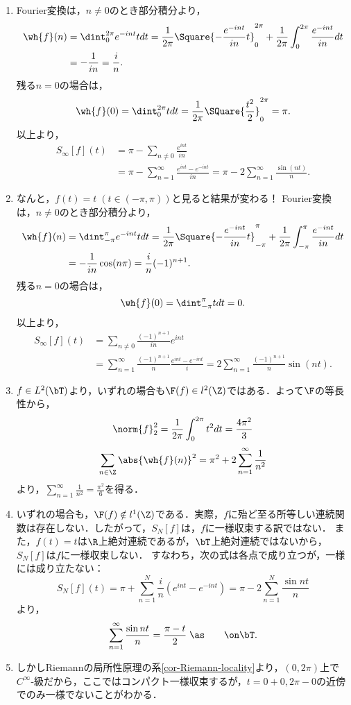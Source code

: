 \documentclass[uplatex,dvipdfmx]{jsreport}
\begin{document}
\begin{Proof}\mbox{}
    \begin{enumerate}
        \item Fourier変換は，$n\ne0$のとき部分積分より，
        \begin{align*}
            \wh{f}(n)&=\dint^{2\pi}_{0}e^{-int}tdt=\frac{1}{2\pi}\Square{-\frac{e^{-int}}{in}t}^{2\pi}_{0}+\frac{1}{2\pi}\int^{2\pi}_{0}\frac{e^{-int}}{in}dt\\
            &=-\frac{1}{in}=\frac{i}{n}.
        \end{align*}
        残る$n=0$の場合は，
        \[\wh{f}(0)=\dint^{2\pi}_0tdt=\frac{1}{2\pi}\SQuare{\frac{t^2}{2}}^{2\pi}_0=\pi.\]
        以上より，
        \begin{align*}
            S_\infty[f](t)&=\pi-\sum_{n\ne0}\frac{e^{int}}{in}\\
            &=\pi-\sum_{n=1}^\infty\frac{e^{int}-e^{-int}}{in}=\pi-2\sum_{n=1}^\infty\frac{\sin(nt)}{n}.
        \end{align*}
        \item なんと，$f(t)=t\;(t\in(-\pi,\pi))$と見ると結果が変わる！
        Fourier変換は，$n\ne0$のとき部分積分より，
        \begin{align*}
            \wh{f}(n)&=\dint^\pi_{-\pi}e^{-int}tdt=\frac{1}{2\pi}\Square{-\frac{e^{-int}}{in}t}^{\pi}_{-\pi}+\frac{1}{2\pi}\int^\pi_{-\pi}\frac{e^{-int}}{in}dt\\
            &=-\frac{1}{in}\cos(n\pi)=\frac{i}{n}(-1)^{n+1}.
        \end{align*}
        残る$n=0$の場合は，
        \[\wh{f}(0)=\dint^\pi_{-\pi}tdt=0.\]
        以上より，
        \begin{align*}
            S_\infty[f](t)&=\sum_{n\ne0}\frac{(-1)^{n+1}}{in}e^{int}\\
            &=\sum_{n=1}^\infty\frac{(-1)^{n+1}}{n}\frac{e^{int}-e^{-int}}{i}=2\sum_{n=1}^\infty\frac{(-1)^{n+1}}{n}\sin(nt).
        \end{align*}
        \item $f\in L^2(\bT)$より，いずれの場合も$\F(f)\in l^2(\Z)$ではある．よって$\F$の等長性から，
        \[\norm{f}^2_2=\frac{1}{2\pi}\int^{2\pi}_0t^2dt=\frac{4\pi^2}{3}\]
        \[\sum_{n\in\Z}\abs{\wh{f}(n)}^2=\pi^2+2\sum_{n=1}^\infty\frac{1}{n^2}\]
        より，$\sum_{n=1}^\infty\frac{1}{n^2}=\frac{\pi^2}{6}$を得る．
        \item いずれの場合も，$\F(f)\notin l^1(\Z)$である．実際，$f$に殆ど至る所等しい連続関数は存在しない．したがって，$S_N[f]$は，$f$に一様収束する訳ではない．
        また，$f(t)=t$は$\R$上絶対連続であるが，$\bT$上絶対連続ではないから，$S_N[f]$は$f$に一様収束しない．
        すなわち，次の式は各点で成り立つが，一様には成り立たない：
        \[S_N[f](t)=\pi+\sum_{n=1}^N\frac{i}{n}(e^{int}-e^{-int})=\pi-2\sum_{n=1}^N\frac{\sin nt}{n}\]
        より，
        \[\sum_{n=1}^\infty\frac{\sin nt}{n}=\frac{\pi-t}{2}\;\as\qquad\on\bT.\]
        \item しかしRiemannの局所性原理の系\ref{cor-Riemann-locality}より，$(0,2\pi)$上で$C^\infty$-級だから，ここではコンパクト一様収束するが，$t=0+0,2\pi-0$の近傍でのみ一様でないことがわかる．
    \end{enumerate}
\end{Proof}
\end{document}
